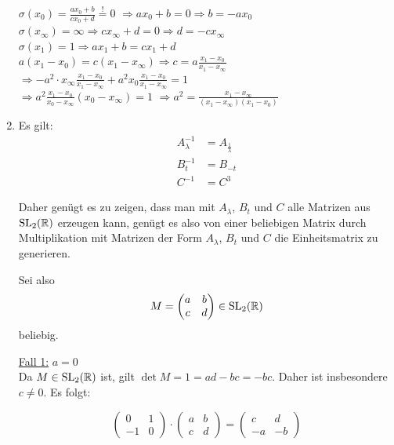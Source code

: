 \begin{beweis}
\begin{enumerate}[label=\alph*)]
              $\sigma(x_0) = \frac{ax_0 + b}{c x_0 + d} \overset{!}{=} 0$
              $\Rightarrow a x_0 + b = 0 \Rightarrow b = -a x_0$\\
              $\sigma(x_\infty) = \infty \Rightarrow c x_\infty + d = 0 \Rightarrow d = - c x_\infty$\\
              $\sigma(x_1) = 1 \Rightarrow a x_1 + b = c x_1 + d$\\
              $a (x_1 - x_0) = c (x_1 - x_\infty) \Rightarrow c = a \frac{x_1 - x_0}{x_1 - x_\infty}$\\
              $\Rightarrow - a^2 \cdot x_\infty \frac{x_1 - x_0}{x_1 - x_\infty} + a^2 x_0 \frac{x_1 - x_0}{x_1 - x_\infty} = 1$\\
              $\Rightarrow a^2 \frac{x_1 - x_0}{x_0 - x_\infty} (x_0 - x_\infty) = 1$
              $\Rightarrow a^2 = \frac{x_1 - x_\infty}{(x_1 - x_\infty) (x_1 - x_0)}$
        \item Es gilt:
              \begin{align*}
                A_{\lambda}^{-1} &= A_{\frac{1}{\lambda}}\\
                B_t^{-1}         &= B_{-t}\\
                C^{-1}           &= C^3
              \end{align*}

              Daher genügt es zu zeigen, dass man mit $A_{\lambda}$, $B_t$ und $C$ alle Matrizen
              aus $\mathrm{SL}_2(\mathbb{R})$ erzeugen kann, genügt es also von einer beliebigen
              Matrix durch Multiplikation mit Matrizen der Form $A_{\lambda}$,
              $B_t$ und $C$ die Einheitsmatrix zu generieren.

              Sei also
              \[M = \begin{pmatrix} a & b\\ c & d\end{pmatrix} \in \mathrm{SL}_2(\mathbb{R})\]
              beliebig.

              \underline{Fall 1:} $a = 0$\\
              Da $M \in \mathrm{SL}_2(\mathbb{R})$ ist, gilt $\det{M} = 1 = ad - bc = -bc$.
              Daher ist insbesondere $c \neq 0$. Es folgt:

              \[\begin{pmatrix} 0 & 1\\ -1 & 0\end{pmatrix} \cdot \begin{pmatrix} a & b\\ c & d\end{pmatrix} = \begin{pmatrix} c & d\\ -a & -b\end{pmatrix}\]


\end{enumerate}
\end{beweis}
